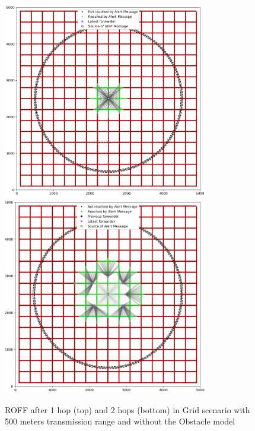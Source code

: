 		\begin{figure}[H]
			\centering
			\includegraphics[width=0.8\textwidth]{immagini/grid-300/b0/roff-1hop}
			\includegraphics[width=0.8\textwidth]{immagini/grid-300/b0/roff-2hop}
			\caption{ROFF after 1 hop (top) and 2 hops (bottom) in Grid scenario with 500 meters transmission range and without the Obstacle model}
			\label{fig:roff-b0-grid-transmission}
		\end{figure}
	
